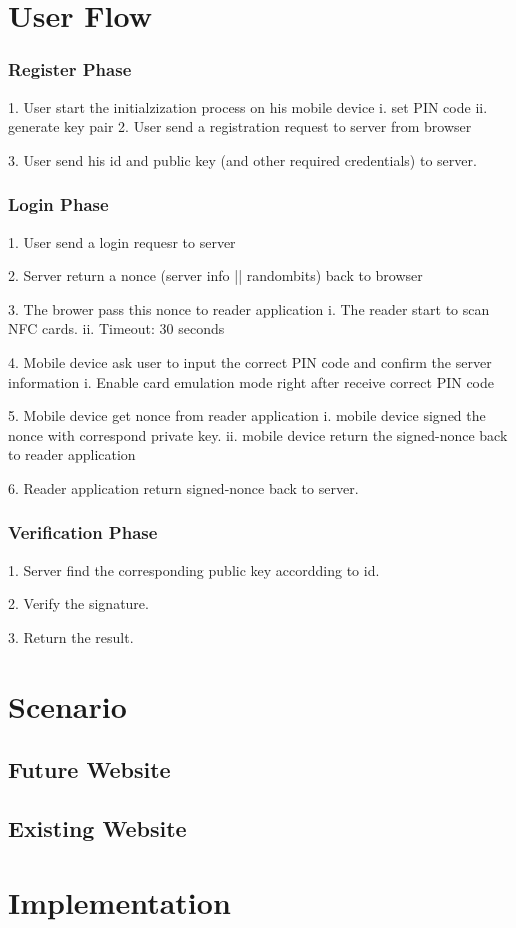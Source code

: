 \begin{CJK}{Bg5}{bsmi}
\section{User Flow}

\subsubsection{Register Phase}

	1. 	User start the initialzization process on his mobile device
		i.  set PIN code
		ii. generate key pair
	2.	User send a registration request to server from browser

	3.	User send his id and public key (and other required credentials) to server.

\subsubsection{Login Phase}

	1. User send a login requesr to server

	2. Server return a nonce ({server info || randombits}) back to browser

	3. The brower pass this nonce to reader application
		i.	The reader start to scan NFC cards.
		ii.	Timeout: 30 seconds

	4. Mobile device ask user to input the correct PIN code and confirm the server information
		i.	Enable card emulation mode right after receive correct PIN code

	5. Mobile device get nonce from reader application
		i.	mobile device signed the nonce with correspond private key.
		ii.	mobile device return the signed-nonce back to reader application

	6. Reader application return signed-nonce back to server.

\subsubsection{Verification Phase}

	1. Server find the corresponding public key accordding to id.

	2. Verify the signature.

	3. Return the result.

\section{Scenario}

\subsection{Future Website}

\subsection{Existing Website}

\section{Implementation}

\end{CJK}